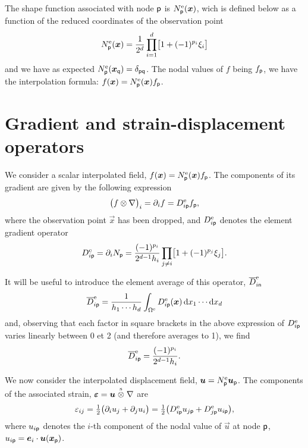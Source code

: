 The shape function associated with node \(\mathsf{p}\) is
\(N^{\mathrm{e}}_{\mathsf{p}}(\boldsymbol x)\), wich is defined below as a function of the
reduced coordinates of the observation point
\begin{equation}
  N^{\mathrm{e}}_{\mathsf{p}}(\boldsymbol x)=\frac1{2^d}\prod_{i=1}^d\bigl[1+(-1)^{p_i}\xi_i\bigr]
\end{equation}
and we have as expected
\(N^{\mathrm{e}}_{\mathsf{p}}(\boldsymbol x_{\mathsf q}) = \delta_{\mathsf{p}\mathsf{q}}\). The
nodal values of \(f\) being \(f_\mathsf{p}\), we have the interpolation formula:
\(f(\boldsymbol x)=N^{\mathrm{e}}_\mathsf{p}(\boldsymbol x)f_\mathsf{p}\).

\section{Gradient and strain-displacement operators}
\label{sec:20210930054808}

We consider a scalar interpolated field,
\(f(\boldsymbol x)=N^{\mathrm{e}}_\mathsf{p}(\boldsymbol x)f_\mathsf{p}\). The components of its
gradient are given by the following expression
\begin{equation}
  \bigl(f\otimes\nabla\bigr)_i=\partial_i f=D_{i\mathsf{p}}^{\mathrm{e}} f_\mathsf{p},
\end{equation}
where the observation point \(\vec x\) has been dropped, and
\(D_{i\mathsf{p}}^{\mathrm{e}}\) denotes the element gradient operator
\begin{equation}
  D_{i\mathsf{p}}^{\mathrm{e}}=\partial_iN_\mathsf{p}
  =\frac{(-1)^{p_i}}{2^{d-1}h_i}
  \prod_{j\neq i}\bigl[1+(-1)^{p_j}\xi_j\bigr].
\end{equation}

It will be useful to introduce the element average of this operator,
\(\overline{D}_{i\mathsf{n}}^{\mathrm{e}}\)
\begin{equation}
  \overline{D}_{i\mathsf{p}}^{\mathrm{e}}=\frac 1{h_1\cdots h_d}
  \int_{\Omega^{\mathrm{e}}}D^{\mathrm{e}}_{i\mathsf{p}}(\boldsymbol x)\,\mathrm d x_1\cdots\mathrm d x_d
\end{equation}
and, observing that each factor in square brackets in the above expression of
\(D^{\mathrm{e}}_{i\mathsf{p}}\) varies linearly between 0 et 2 (and therefore
averages to 1), we find
\begin{equation}
  \overline{D}^{\mathrm{e}}_{i\mathsf{p}}=\frac{(-1)^{p_i}}{2^{d-1}h_i}.
\end{equation}

We now consider the interpolated displacement field,
\(\boldsymbol u = N^{\mathrm{e}}_\mathsf{p} \boldsymbol u_\mathsf{p}\). The components of the
associated strain, \(\boldsymbol\varepsilon=\boldsymbol u\stackrel{\mathrm{s}}{\otimes}\nabla\) are
\begin{equation}
  \varepsilon_{ij}=\tfrac12\bigl(\partial_iu_j+\partial_ju_i\bigr)
  =\tfrac12\bigl(D^{\mathrm{e}}_{i\mathsf{p}}u_{j\mathsf{p}}
  +D^{\mathrm{e}}_{j\mathsf{p}}u_{i\mathsf{p}}\bigr),
\end{equation}
where \(u_{i\mathsf{p}}\) denotes the \(i\)-th component of the nodal value of
\(\vec u\) at node \(\mathsf{p}\),
\(u_{i\mathsf{p}}=\boldsymbol e_i\cdot\boldsymbol u(\boldsymbol x_\mathsf{p})\).

